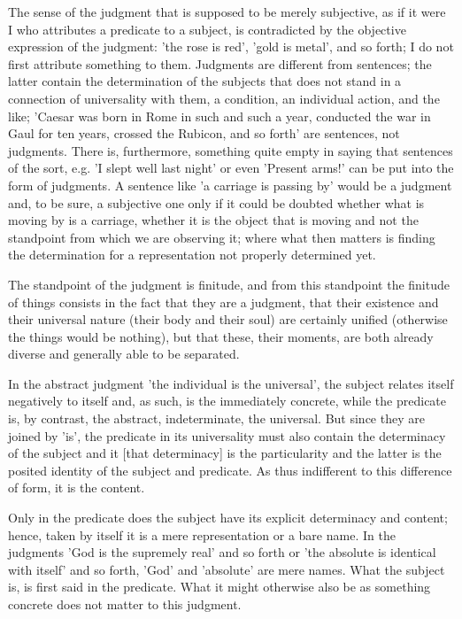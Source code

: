 The sense of the judgment that is supposed to be merely subjective,
as if it were I who attributes a predicate to a subject,
is contradicted by the objective expression of the judgment:
'the rose is red', 'gold is metal', and so forth;
I do not first attribute something to them.
Judgments are different from sentences;
the latter contain the determination of the subjects
that does not stand in a connection of universality with them,
a condition, an individual action, and the like;
'Caesar was born in Rome in such and such a year,
conducted the war in Gaul for ten years, crossed the Rubicon,
and so forth' are sentences, not judgments.
There is, furthermore, something quite empty
in saying that sentences of the sort, e.g.
'I slept well last night' or even 'Present arms!'
can be put into the form of judgments.
A sentence like 'a carriage is passing by' would be a judgment
and, to be sure, a subjective one only if it could be doubted
whether what is moving by is a carriage,
whether it is the object that is moving and not
the standpoint from which we are observing it;
where what then matters is finding the determination
for a representation not properly determined yet.

The standpoint of the judgment is finitude, and from this standpoint the
finitude of things consists in the fact that they are a judgment,
that their existence and their universal nature (their body and their soul) are
certainly unified (otherwise the things would be nothing), but that these,
their moments, are both already diverse and generally able to be separated.

In the abstract judgment 'the individual is the universal',
the subject relates itself negatively to itself and, as such,
is the immediately concrete, while the predicate is, by contrast,
the abstract, indeterminate, the universal.
But since they are joined by 'is', the predicate in its universality
must also contain the determinacy of the subject
and it [that determinacy] is the particularity
and the latter is the posited identity of the subject and predicate.
As thus indifferent to this difference of form, it is the content.

Only in the predicate does the subject
have its explicit determinacy and content;
hence, taken by itself it is a mere representation or a bare name.
In the judgments 'God is the supremely real' and so forth
or 'the absolute is identical with itself' and so forth,
'God' and 'absolute' are mere names.
What the subject is, is first said in the predicate.
What it might otherwise also be as something concrete
does not matter to this judgment.

